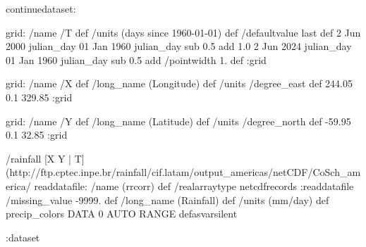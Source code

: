 \begin{ingrid}

continuedataset:

grid:
/name /T def
/units (days since 1960-01-01) def
/defaultvalue { last } def
2 Jun 2000 julian_day 01 Jan 1960 julian_day sub 0.5 add
1.0
2 Jun 2024 julian_day 01 Jan 1960 julian_day sub 0.5 add
/pointwidth 1. def
:grid

grid:
/name /X def
/long_name (Longitude) def
/units /degree_east def
244.05 0.1 329.85
:grid

grid:
/name /Y def
/long_name (Latitude) def
/units /degree_north def
-59.95 0.1 32.85
:grid

/rainfall {
[X Y | T]
(http://ftp.cptec.inpe.br/rainfall/cif.latam/output_americas/netCDF/CoSch_america/%
readdatafile:
/name (rrcorr) def
/realarraytype netcdfrecords
:readdatafile
/missing_value -9999. def
/long_name (Rainfall) def
/units (mm/day) def
precip_colors
DATA 0 AUTO RANGE
}defasvarsilent

:dataset

\end{ingrid}
